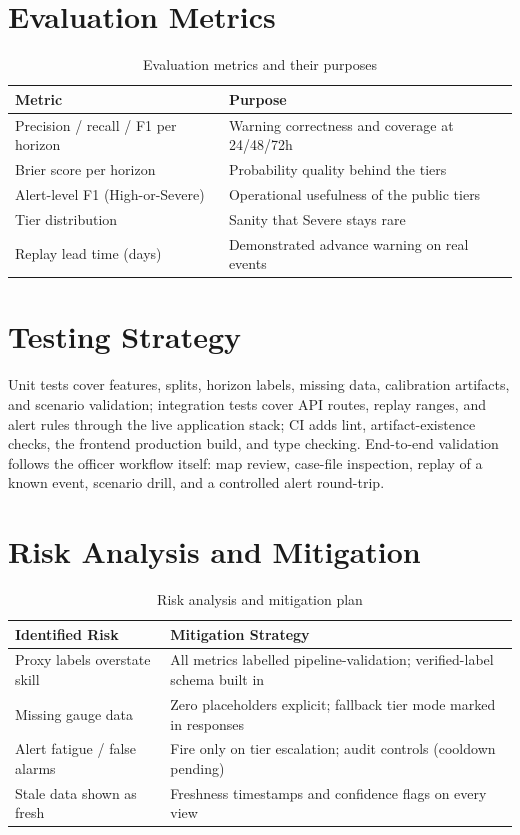 \documentclass[a4paper,12pt]{report}
\begin{document}
\section{Evaluation Metrics}
\begin{table}[H]
\centering
\renewcommand{\arraystretch}{1.3}
\begin{tabularx}{\textwidth}{|>{\raggedright\arraybackslash}p{4cm}|X|}
\hline
\textbf{Metric} & \textbf{Purpose} \\ \hline
Precision / recall / F1 per horizon & Warning correctness and coverage at 24/48/72h \\ \hline
Brier score per horizon & Probability quality behind the tiers \\ \hline
Alert-level F1 (High-or-Severe) & Operational usefulness of the public tiers \\ \hline
Tier distribution & Sanity that Severe stays rare \\ \hline
Replay lead time (days) & Demonstrated advance warning on real events \\ \hline
\end{tabularx}
\caption{Evaluation metrics and their purposes}
\label{tab:evalmetrics}
\end{table}

\section{Testing Strategy}
Unit tests cover features, splits, horizon labels, missing data, calibration artifacts, and scenario validation; integration tests cover API routes, replay ranges, and alert rules through the live application stack; CI adds lint, artifact-existence checks, the frontend production build, and type checking. End-to-end validation follows the officer workflow itself: map review, case-file inspection, replay of a known event, scenario drill, and a controlled alert round-trip.

\section{Risk Analysis and Mitigation}
\begin{table}[H]
\centering
\renewcommand{\arraystretch}{1.3}
\begin{tabularx}{\textwidth}{|>{\raggedright\arraybackslash}p{4cm}|X|}
\hline
\textbf{Identified Risk} & \textbf{Mitigation Strategy} \\ \hline
Proxy labels overstate skill & All metrics labelled pipeline-validation; verified-label schema built in \\ \hline
Missing gauge data & Zero placeholders explicit; fallback tier mode marked in responses \\ \hline
Alert fatigue / false alarms & Fire only on tier escalation; audit controls (cooldown pending) \\ \hline
Stale data shown as fresh & Freshness timestamps and confidence flags on every view \\ \hline
\end{tabularx}
\caption{Risk analysis and mitigation plan}
\label{tab:risk}
\end{table}
\end{document}
